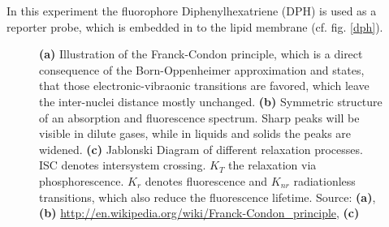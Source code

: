 \documentclass{scrartcl}
\numberwithin{equation}{section}
\numberwithin{figure}{section}
\numberwithin{table}{section}
\begin{document}
In this experiment the fluorophore Diphenylhexatriene (DPH) is used as a reporter probe, which is embedded in to the lipid membrane (cf. fig. \ref{dph}).

\begin{figure}
\centering
{}
\hfill
{}

\caption{ \small \textbf{(a)} Illustration of the Franck-Condon principle, which is a direct consequence of the Born-Oppenheimer approximation and states, that those electronic-vibraonic transitions are favored, which leave the inter-nuclei distance mostly unchanged. 
\textbf{(b)} Symmetric structure of an absorption and fluorescence spectrum. Sharp peaks will be visible in dilute gases, while in liquids and solids the peaks are widened. 
\textbf{(c)} Jablonski Diagram of different relaxation processes. ISC denotes intersystem crossing. $K_T$ the relaxation via phosphorescence. $K_r$ denotes fluorescence and $K_{nr}$ radiationless transitions, which also reduce the fluorescence lifetime. \footnotesize Source: \textbf{(a)}, \textbf{(b)} \url{http://en.wikipedia.org/wiki/Franck-Condon_principle}, \textbf{(c)} \cite{omg}}
\label{condon}
\end{figure}
\end{document}
